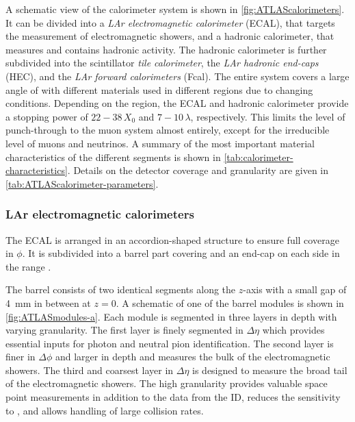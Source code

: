 A schematic view of the calorimeter system is shown in \cref{fig:ATLAScalorimeters}.
It can be divided into a \emph{LAr electromagnetic calorimeter} (ECAL), that targets the measurement of electromagnetic showers, and a hadronic calorimeter, that measures and contains hadronic activity. The hadronic calorimeter is further subdivided into the scintillator \emph{tile calorimeter}, the \emph{LAr hadronic end-caps} (HEC), and the \emph{LAr forward calorimeters} (Fcal).
The entire system covers a large angle of  with different materials used in different \abseta regions due to changing conditions.
Depending on the \abseta region, the ECAL and hadronic calorimeter provide a stopping power of $22-38\,X_0$ and $7-10\,\lambda$, respectively.
This limits the level of punch-through to the muon system almost entirely, except for the irreducible level of muons and neutrinos. %
A summary of the most important material characteristics of the different segments is shown in \cref{tab:calorimeter-characteristics}.
Details on the detector coverage and granularity are given in \cref{tab:ATLAScalorimeter-parameters}.

\FloatBarrier


\subsubsection{LAr electromagnetic calorimeters}
The ECAL is arranged in an accordion-shaped structure to ensure full coverage in $\phi$.
It is subdivided into a barrel part covering  and an end-cap on each side in the range .

The barrel consists of two identical segments along the $z$-axis with a small gap of \SI{4}{\milli\meter} in between at $z=0$. A schematic of one of the barrel modules is shown in \cref{fig:ATLASmodules-a}. Each module is segmented in three layers in depth with varying granularity.
The first layer is finely segmented in $\Delta \eta$ which provides essential inputs for photon and neutral pion identification. The second layer is finer in $\Delta \phi$ and larger in depth and measures the bulk of the electromagnetic showers. The third and coarsest layer in $\Delta \eta$ is designed to measure the broad tail of the electromagnetic showers.
The high granularity provides valuable space point measurements in addition to the data from the ID, reduces the sensitivity to \pileup, and allows handling of large collision rates.

